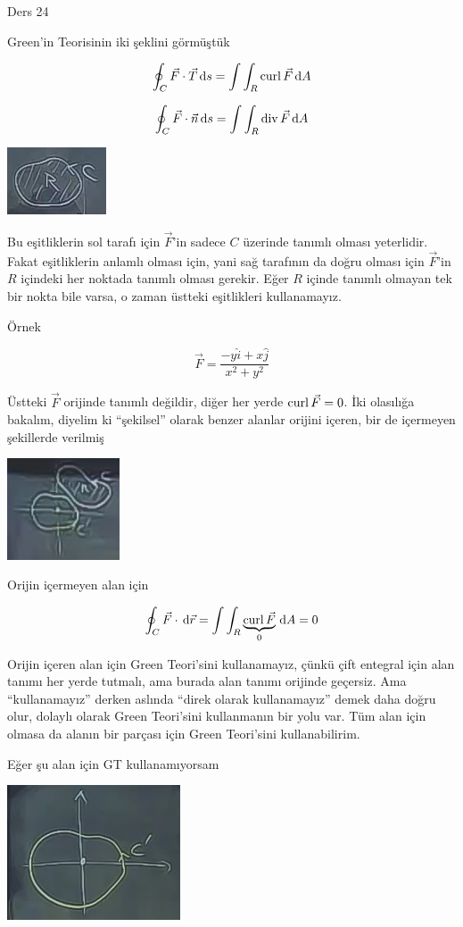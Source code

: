 \documentclass[12pt,fleqn]{article}\usepackage{../../common}
\begin{document}
Ders 24

Green'in Teorisinin iki şeklini görmüştük

$$ \oint_C \vec{F} \cdot \vec{T} \,\mathrm{d} s = \int \int_R \operatorname{curl} \vec{F} \,\mathrm{d} A $$

$$ \oint_C \vec{F} \cdot \vec{n} \,\mathrm{d} s = \int \int_R \operatorname{div} \vec{F} \,\mathrm{d} A $$

\includegraphics[height=2cm]{24_1.png}

Bu eşitliklerin sol tarafı için $\vec{F}$'in sadece $C$ üzerinde tanımlı
olması yeterlidir. Fakat eşitliklerin anlamlı olması için, yani sağ
tarafının da doğru olması için $\vec{F}$'in $R$ içindeki her noktada tanımlı
olması gerekir. Eğer $R$ içinde tanımlı olmayan tek bir nokta bile varsa, o
zaman üstteki eşitlikleri kullanamayız.

Örnek 

$$ \vec{F} = \frac{ -y\hat{i} + x\hat{j}}{x^2+y^2} $$

Üstteki $\vec{F}$ orijinde tanımlı değildir, diğer her yerde $\operatorname{curl} \vec{F} =
0$.  İki olasılığa bakalım, diyelim ki ``şekilsel'' olarak benzer alanlar
orijini içeren, bir de içermeyen şekillerde verilmiş

\includegraphics[height=3cm]{24_2.png}

Orijin içermeyen alan için

$$
\oint_C \vec{F} \cdot \,\mathrm{d}\vec{r} = 
\int \int_R \underbrace{\operatorname{curl} \vec{F}}_{0} \,\mathrm{d} A  = 0
$$
 
Orijin içeren alan için Green Teori'sini kullanamayız, çünkü çift entegral
için alan tanımı her yerde tutmalı, ama burada alan tanımı orijinde
geçersiz. Ama ``kullanamayız'' derken aslında ``direk olarak kullanamayız''
demek daha doğru olur, dolaylı olarak Green Teori'sini kullanmanın bir yolu
var. Tüm alan için olmasa da alanın bir parçası için Green Teori'sini
kullanabilirim. 

Eğer şu alan için GT kullanamıyorsam

\includegraphics[height=4cm]{24_3.png}
\end{document}
